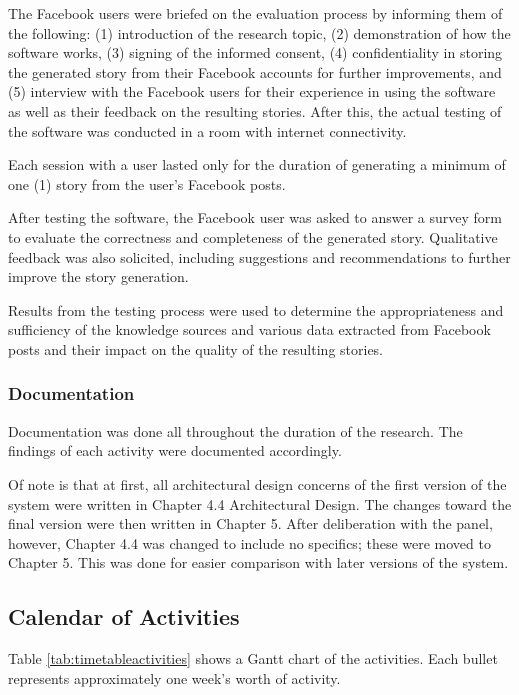 The Facebook users were briefed on the evaluation process by informing them of the following: (1) introduction of the research topic, (2) demonstration of how the software works, (3) signing of the informed consent, (4) confidentiality in storing the generated story from their Facebook accounts for further improvements, and (5) interview with the Facebook users for their experience in using the software as well as their feedback on the resulting stories. After this, the actual testing of the software was conducted in a room with internet connectivity. 

Each session with a user lasted only for the duration of generating a minimum of one (1) story from the user's Facebook posts. 

After testing the software, the Facebook user was asked to answer a survey form to evaluate the correctness and completeness of the generated story. Qualitative feedback was also solicited, including suggestions and recommendations to further improve the story generation.

Results from the testing process were used to determine the appropriateness and sufficiency of the knowledge sources and various data extracted from Facebook posts and their impact on the quality of the resulting stories.

\subsubsection{Documentation}
Documentation was done all throughout the duration of the research. The findings of each activity were documented accordingly.

Of note is that at first, all architectural design concerns of the first version of the system were written in Chapter 4.4 Architectural Design. The changes toward the final version were then written in Chapter 5. After deliberation with the panel, however, Chapter 4.4 was changed to include no specifics; these were moved to Chapter 5. This was done for easier comparison with later versions of the system.

\subsection{Calendar of Activities}

Table \ref{tab:timetableactivities} shows a Gantt chart of the activities. Each bullet represents approximately one week's worth of activity.

%
%
\newcommand{\weekone}{\textbullet}
\newcommand{\weektwo}{\textbullet \textbullet}
\newcommand{\weekthree}{\textbullet \textbullet \textbullet}
\newcommand{\weekfour}{\textbullet \textbullet \textbullet \textbullet}

